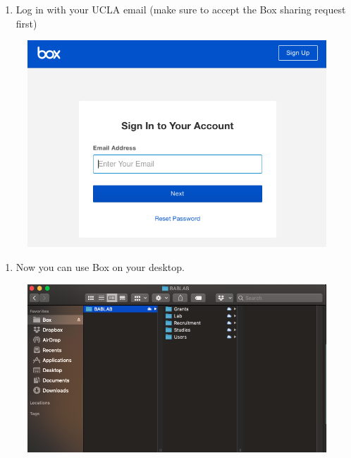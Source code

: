 \documentclass[]{book}
\providecommand{\tightlist}{%
  \setlength{\itemsep}{0pt}\setlength{\parskip}{0pt}}
\begin{document}
\begin{enumerate}
\def\labelenumi{\arabic{enumi}.}
\setcounter{enumi}{2}
\tightlist
\item
  Log in with your UCLA email (make sure to accept the Box sharing request first)
\end{enumerate}

\begin{figure}
\centering
\includegraphics{images/lab_protocols/box/3.png}
\caption{}
\end{figure}

\begin{enumerate}
\def\labelenumi{\arabic{enumi}.}
\setcounter{enumi}{3}
\tightlist
\item
  Now you can use Box on your desktop.
\end{enumerate}

\begin{figure}
\centering
\includegraphics{images/lab_protocols/box/4.png}
\caption{}
\end{figure}
\end{document}
